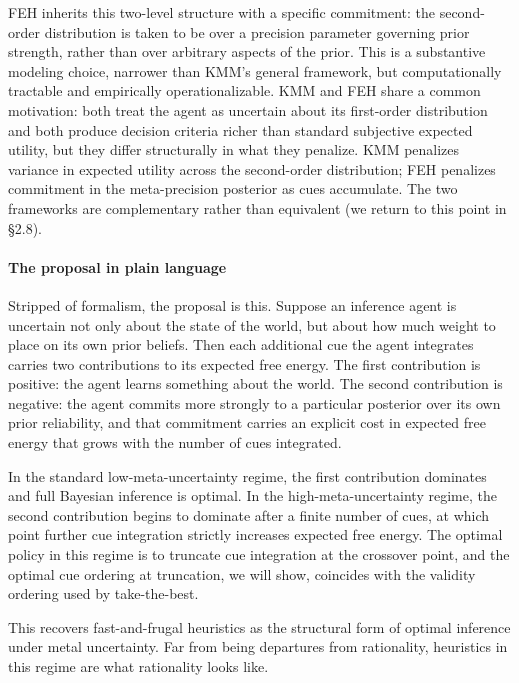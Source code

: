 \documentclass{article}
\begin{document}
FEH inherits this two-level structure with a specific commitment: the
second-order distribution is taken to be over a precision parameter
governing prior strength, rather than over arbitrary aspects of the
prior. This is a substantive modeling choice, narrower than KMM's
general framework, but computationally tractable and empirically
operationalizable. KMM and FEH share a common motivation: both treat the
agent as uncertain about its first-order distribution and both produce
decision criteria richer than standard subjective expected utility, but
they differ structurally in what they penalize. KMM penalizes variance
in expected utility across the second-order distribution; FEH penalizes
commitment in the meta-precision posterior as cues accumulate. The two
frameworks are complementary rather than equivalent (we return to this
point in \S{}2.8).

\paragraph{The proposal in plain
language}\label{the-proposal-in-plain-language}

Stripped of formalism, the proposal is this. Suppose an inference agent
is uncertain not only about the state of the world, but about how much
weight to place on its own prior beliefs. Then each additional cue the
agent integrates carries two contributions to its expected free energy.
The first contribution is positive: the agent learns something about the
world. The second contribution is negative: the agent commits more
strongly to a particular posterior over its own prior reliability, and
that commitment carries an explicit cost in expected free energy that
grows with the number of cues integrated.

In the standard low-meta-uncertainty regime, the first contribution
dominates and full Bayesian inference is optimal. In the
high-meta-uncertainty regime, the second contribution begins to dominate
after a finite number of cues, at which point further cue integration
strictly increases expected free energy. The optimal policy in this
regime is to truncate cue integration at the crossover point, and the
optimal cue ordering at truncation, we will show, coincides with the
validity ordering used by take-the-best.

This recovers fast-and-frugal heuristics as the structural form of
optimal inference under metal uncertainty. Far from being departures
from rationality, heuristics in this regime are what rationality looks
like.
\end{document}
